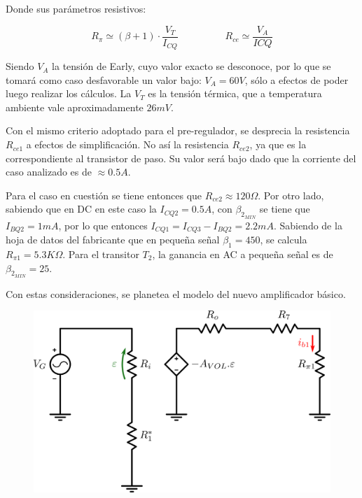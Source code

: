 Donde sus par\'ametros resistivos:

\[
R_{\pi} \simeq (\beta+1) \cdot \frac{V_T}{I_{CQ}}  \hspace{2cm} R_{ce} \simeq \frac{V_A}{ICQ}
\]

Siendo $V_A$ la tensi\'on de Early, cuyo valor exacto se desconoce, por lo que se tomar\'a como caso desfavorable un valor bajo: $V_A = 60V$, s\'olo a efectos de poder luego realizar los c\'alculos. La $V_T$ es la tensi\'on t\'ermica, que a temperatura ambiente vale aproximadamente $26mV$.\par
Con el mismo criterio adoptado para el pre-regulador, se desprecia la resistencia $R_{ce1}$ a efectos de simplificaci\'on. No as\'i la resistencia $R_{ce2}$, ya que es la correspondiente al transistor de paso. Su valor ser\'a bajo dado que la corriente del caso analizado es de $\approx 0.5A$.\par
Para el caso en cuesti\'on se tiene entonces que $R_{ce2} \approx 120\Omega$. Por otro lado, sabiendo que en DC en este caso la $I_{CQ2} = 0.5A$, con $\beta_{2_{MIN}}$ se tiene que $I_{BQ2} = 1mA$, por lo que entonces $I_{CQ1} = I_{CQ3} - I_{BQ2} = 2.2mA$. Sabiendo de la hoja de datos del fabricante que en pequeña se\~nal $\beta_1 = 450$, se calcula $R_{\pi1} = 5.3K\Omega$. Para el transitor $T_2$, la ganancia en AC a pequeña se\~nal es de $\beta_{2_{MIN}} = 25$.\par
Con estas consideraciones, se planetea el modelo del nuevo amplificador b\'asico.

\begin{figure}[!ht]
\begin{centering}
\includegraphics[scale=0.5]{Imagenes/NuevoAmpBasicoCancer_Parte1.png}
\par\end{centering}

\end{figure}

